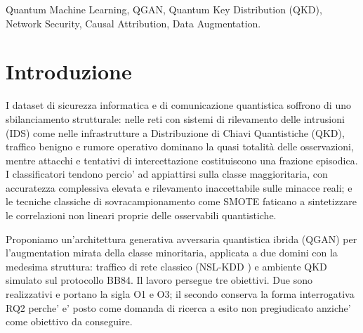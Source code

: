 \documentclass[10pt,conference,a4paper,twocolumn]{IEEEtran}
\begin{document}
\begin{IEEEkeywords}
    Quantum Machine Learning, QGAN, Quantum Key Distribution (QKD), Network Security, Causal Attribution, Data Augmentation.
\end{IEEEkeywords}

\section{Introduzione}

I dataset di sicurezza informatica e di comunicazione quantistica soffrono di uno sbilanciamento strutturale: nelle reti con sistemi di rilevamento delle intrusioni (IDS) come nelle infrastrutture a Distribuzione di Chiavi Quantistiche (QKD), traffico benigno e rumore operativo dominano la quasi totalità delle osservazioni, mentre attacchi e tentativi di intercettazione costituiscono una frazione episodica. I classificatori tendono percio' ad appiattirsi sulla classe maggioritaria, con accuratezza complessiva elevata e rilevamento inaccettabile sulle minacce reali; e le tecniche classiche di sovracampionamento come SMOTE \cite{smote} faticano a sintetizzare le correlazioni non lineari proprie delle osservabili quantistiche.

Proponiamo un'architettura generativa avversaria quantistica ibrida (QGAN) per l'augmentation mirata della classe minoritaria, applicata a due domini con la medesima struttura: traffico di rete classico (NSL-KDD \cite{nslkdd}) e ambiente QKD simulato sul protocollo BB84. Il lavoro persegue tre obiettivi. Due sono realizzativi e portano la sigla O1 e O3; il secondo conserva la forma interrogativa RQ2 perche' e' posto come domanda di ricerca a esito non pregiudicato anziche' come obiettivo da conseguire.
\end{document}
